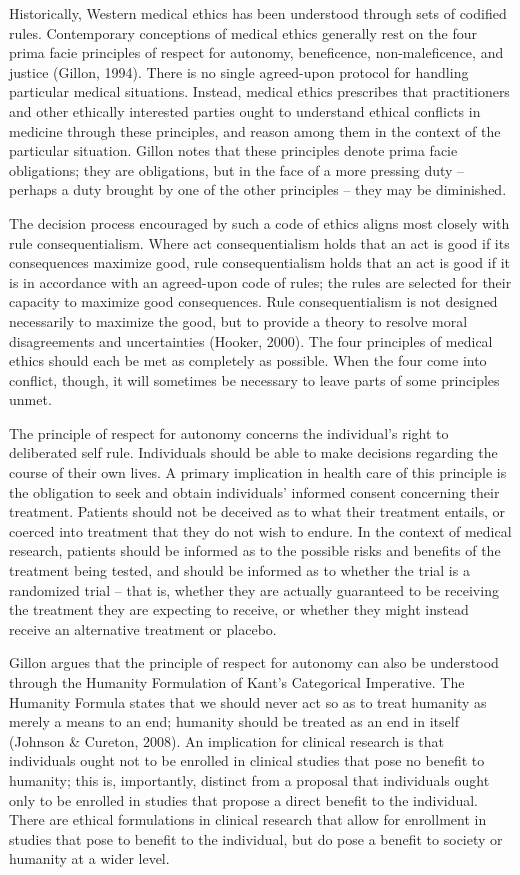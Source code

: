 \documentclass[]{spie}  %
\begin{document}
Historically, Western medical ethics has been understood through sets of codified rules. Contemporary conceptions of medical ethics generally rest on the four prima facie principles of respect for autonomy, beneficence, non-maleficence, and justice (Gillon, 1994). There is no single agreed-upon protocol for handling particular medical situations. Instead, medical ethics prescribes that practitioners and other ethically interested parties ought to understand ethical conflicts in medicine through these principles, and reason among them in the context of the particular situation. Gillon notes that these principles denote prima facie obligations; they are obligations, but in the face of a more pressing duty -- perhaps a duty brought by one of the other principles -- they may be diminished.

The decision process encouraged by such a code of ethics aligns most closely with rule consequentialism. Where act consequentialism holds that an act is good if its consequences maximize good, rule consequentialism holds that an act is good if it is in accordance with an agreed-upon code of rules; the rules are selected for their capacity to maximize good consequences. Rule consequentialism is not designed necessarily to maximize the good, but to provide a theory to resolve moral disagreements and uncertainties (Hooker, 2000). The four principles of medical ethics should each be met as completely as possible. When the four come into conflict, though, it will sometimes be necessary to leave parts of some principles unmet.

The principle of respect for autonomy concerns the individual’s right to deliberated self rule. Individuals should be able to make decisions regarding the course of their own lives. A primary implication in health care of this principle is the obligation to seek and obtain individuals’ informed consent concerning their treatment. Patients should not be deceived as to what their treatment entails, or coerced into treatment that they do not wish to endure. In the context of medical research, patients should be informed as to the possible risks and benefits of the treatment being tested, and should be informed as to whether the trial is a randomized trial -- that is, whether they are actually guaranteed to be receiving the treatment they are expecting to receive, or whether they might instead receive an alternative treatment or placebo.

Gillon argues that the principle of respect for autonomy can also be understood through the Humanity Formulation of Kant’s Categorical Imperative. The Humanity Formula states that we should never act so as to treat humanity as merely a means to an end; humanity should be treated as an end in itself (Johnson \& Cureton, 2008). An implication for clinical research is that individuals ought not to be enrolled in clinical studies that pose no benefit to humanity; this is, importantly, distinct from a proposal that individuals ought only to be enrolled in studies that propose a direct benefit to the individual. There are ethical formulations in clinical research that allow for enrollment in studies that pose to benefit to the individual, but do pose a benefit to society or humanity at a wider level.
\end{document}
